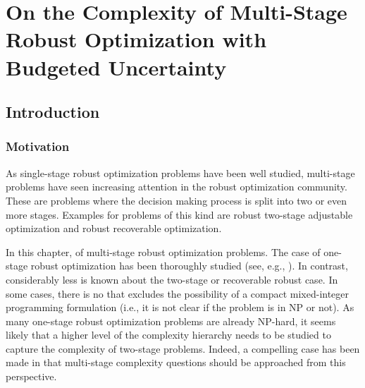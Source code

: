 







\chapter{On the Complexity of Multi-Stage Robust Optimization with Budgeted Uncertainty}
\label{ch:multistage-complexity}

\section{Introduction}

\subsection{Motivation}

As single-stage robust optimization problems have been well studied, multi-stage problems have seen increasing attention in the robust optimization community. These are problems where the decision making process is split into two or even more stages. Examples for problems of this kind are robust two-stage adjustable optimization and robust recoverable optimization.

In this chapter,  of multi-stage robust optimization problems. The case of one-stage robust optimization has been thoroughly studied (see, e.g., \cite{kasperski2016robust}). In contrast, considerably less is known about the two-stage or recoverable robust case. In some cases, there is no
that excludes the possibility of a compact mixed-integer programming formulation (i.e., it is not clear if the problem is in NP or not). As many one-stage robust optimization problems are already NP-hard, it seems likely that a higher level of the complexity hierarchy \cite{stockmeyer1976polynomial} needs to be studied to capture the complexity of two-stage problems. Indeed, a compelling case has been made in \cite{woeginger2021trouble} that multi-stage complexity questions should be approached from this perspective.

